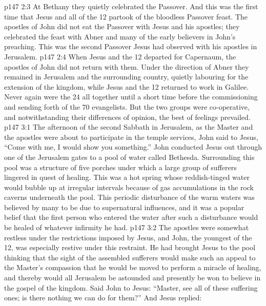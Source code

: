 \vs p147 2:3 At Bethany they quietly celebrated the Passover. And this was the first time that Jesus and all of the 12 partook of the bloodless Passover feast. The apostles of John did not eat the Passover with Jesus and his apostles; they celebrated the feast with Abner and many of the early believers in John’s preaching. This was the second Passover Jesus had observed with his apostles in Jerusalem.
\vs p147 2:4 When Jesus and the 12 departed for Capernaum, the apostles of John did not return with them. Under the direction of Abner they remained in Jerusalem and the surrounding country, quietly labouring for the extension of the kingdom, while Jesus and the 12 returned to work in Galilee. Never again were the 24 all together until a short time before the commissioning and sending forth of the 70 evangelists. But the two groups were co\hyp{}operative, and notwithstanding their differences of opinion, the best of feelings prevailed.
\vs p147 3:1 The afternoon of the second Sabbath in Jerusalem, as the Master and the apostles were about to participate in the temple services, John said to Jesus, “Come with me, I would show you something.” John conducted Jesus out through one of the Jerusalem gates to a pool of water called Bethesda. Surrounding this pool was a structure of five porches under which a large group of sufferers lingered in quest of healing. This was a hot spring whose reddish\hyp{}tinged water would bubble up at irregular intervals because of gas accumulations in the rock caverns underneath the pool. This periodic disturbance of the warm waters was believed by many to be due to supernatural influences, and it was a popular belief that the first person who entered the water after such a disturbance would be healed of whatever infirmity he had.
\vs p147 3:2 The apostles were somewhat restless under the restrictions imposed by Jesus, and John, the youngest of the 12, was especially restive under this restraint. He had brought Jesus to the pool thinking that the sight of the assembled sufferers would make such an appeal to the Master’s compassion that he would be moved to perform a miracle of healing, and thereby would all Jerusalem be astounded and presently be won to believe in the gospel of the kingdom. Said John to Jesus: “Master, see all of these suffering ones; is there nothing we can do for them?” And Jesus replied: 
